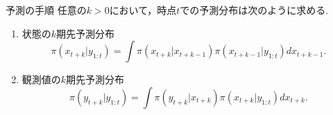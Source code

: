 \documentclass[dvipdfmx]{beamer}
\newcommand{\backupend}{
\addtocounter{framenumberappendix}{-\value{framenumber}}
\addtocounter{framenumber}{\value{framenumberappendix}}
}
\begin{document}
\begin{frame}{予測の手順}
任意の$k>0$において，時点$t$での予測分布は次のように求める.
\begin{enumerate}
 \item 状態の$k$期先予測分布
\begin{equation*}
\pi(x_{t+k}|y_{1:t})=\int\pi(x_{t+k}|x_{t+k-1})\pi(x_{t+k-1}|y_{1:t})dx_{t+k-1}.
\end{equation*}
 \item 観測値の$k$期先予測分布
\begin{equation*}
\pi(y_{t+k}|y_{1:t})=\int \pi(y_{t+k}|x_{t+k})\pi(x_{t+k}|y_{1:t})dx_{t+k}.
\end{equation*}
\end{enumerate}
\end{frame}



\backupend
\end{document}
